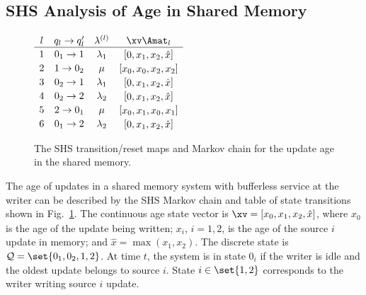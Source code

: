 \documentclass[conference, 10pt]{IEEEtran}
\newcommand{\Qcal}{\mathcal{Q}}
\newcommand{\R}{\mathbb{R}}
\newcommand{\laml}[1][l]{\lambda^{(#1)}}
\newcommand{\rowvec}[1]{[\begin{matrix} #1\end{matrix}]}
\newcommand{\rvec}[1]{\smrvec{#1}}
\newcommand{\smrvec}[1]{\setlength\arraycolsep{2pt}\rowvec{#1}}
\newcommand{\lam}{\lambda}
\newcommand{\gam}{\gamma}
\newcommand{\V}[1]{\quad{\color{blue} #1}\quad}
\begin{document}
\subsection{SHS Analysis of Age in Shared Memory}
\begin{figure}[t]
$\setlength{\extrarowheight}{0.5mm}
\begin{array}[b]{cccc}
l & q_l\to q^\prime_l & \laml &  \xv\Amat_l \\ \hline
1 & 0_1\to1 & \lam_1 & \rvec{0, x_1, x_2, \hat{x}} \\
2 & 1\to0_2 & \mu & \rvec{x_0, x_0, x_2, x_2} \\
3 & 0_2\to1 & \lam_1 & \rvec{0, x_1, x_2, \hat{x}} \\
4 & 0_2\to2 & \lam_2 & \rvec{0, x_1, x_2, \hat{x}} \\
5 & 2\to0_1 & \mu & \rvec{x_0, x_1, x_0, x_1} \\
6 & 0_1\to2 & \lam_2 & \rvec{0, x_1, x_2, \hat{x}}
\end{array}$
\hfill
{}
\caption{The SHS transition/reset maps and Markov chain for the update age in the shared memory.}
\label{fig:simplified-tc-mc}
\end{figure}
The age of updates in a shared memory system 
with bufferless service at the writer  can be described by the SHS Markov chain and table of state transitions shown in Fig.~\ref{fig:simplified-tc-mc}.  The continuous age state vector 
is $\xv = \rvec{x_0, x_1, x_2, \hat{x}}$, where 
$x_0$ is the age of the update being written; $x_i$, $i=1,2$,  is the age of the source $i$ update in memory; and
$\hat{x}=\max(x_1,x_2)$. 
The discrete state is $\Qcal = \set{0_1, 0_2, 1, 2}$. At time $t$, the system  is in state $0_i$ if the writer is idle and the oldest update belongs to source $i$. State $i\in \set{1, 2}$ corresponds to the writer writing source $i$ update.
\end{document}
